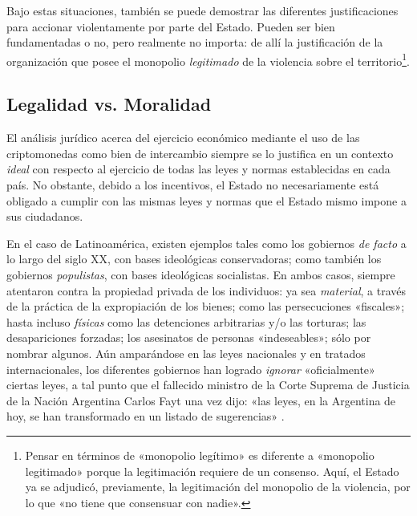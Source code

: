 \documentclass[12pt,a4paper,twoside]{book}
\begin{document}
Bajo estas situaciones, también se puede demostrar las diferentes justificaciones para accionar violentamente por parte del Estado. Pueden ser bien fundamentadas o no, pero realmente no importa: de allí la justificación de la organización que posee el monopolio \textit{legitimado} de la violencia sobre el territorio\footnote{Pensar en términos de «monopolio legítimo» es diferente a «monopolio legitimado» porque la legitimación requiere de un consenso. Aquí, el Estado ya se adjudicó, previamente, la legitimación del monopolio de la violencia, por lo que «no tiene que consensuar con nadie».}.

\subsection{Legalidad vs. Moralidad}
El análisis jurídico acerca del ejercicio económico mediante el uso de las criptomonedas como bien de intercambio siempre se lo justifica en un contexto \textit{ideal} con respecto al ejercicio de todas las leyes y normas establecidas en cada país. No obstante, debido a los incentivos, el Estado no necesariamente está obligado a cumplir con las mismas leyes y normas que el Estado mismo impone a sus ciudadanos.

En el caso de Latinoamérica, existen ejemplos tales como los gobiernos \textit{de facto} a lo largo del siglo XX, con bases ideológicas conservadoras; como también los gobiernos \textit{populistas}, con bases ideológicas socialistas. En ambos casos, siempre atentaron contra la propiedad privada de los individuos: ya sea \textit{material}, a través de la práctica de la expropiación de los bienes; como las persecuciones «fiscales»; hasta incluso \textit{físicas} como las detenciones arbitrarias y/o las torturas; las desapariciones forzadas; los asesinatos de personas «indeseables»; sólo por nombrar algunos. Aún amparándose en las leyes nacionales y en tratados internacionales, los diferentes gobiernos han logrado \textit{ignorar} «oficialmente» ciertas leyes, a tal punto que el fallecido ministro de la Corte Suprema de Justicia de la Nación Argentina Carlos Fayt una vez dijo: «las leyes, en la Argentina de hoy, se han transformado en un listado de sugerencias» \cite{frase-fayt}.
\end{document}
